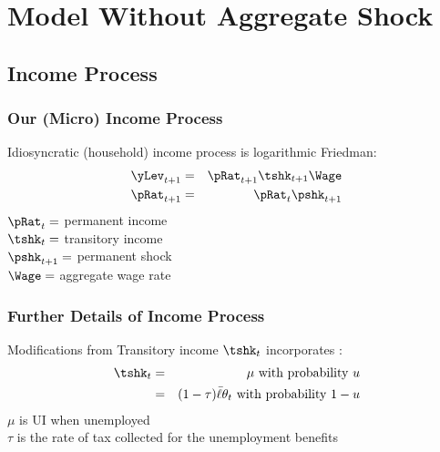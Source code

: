 \section{Model Without Aggregate Shock}

\subsection{Income Process}
\begin{frame}
\frametitle{{Our (Micro) Income Process}}

Idiosyncratic (household) income process is logarithmic Friedman:
  \begin{eqnarray*}
\yLev_{t+1}&=&\pRat_{t+1}\tshk_{t+1}\Wage\\
\pRat_{t+1}&=&\pRat_{t}\pshk_{t+1}
\end{eqnarray*}
$\pRat_{t}=$ permanent income\\
$\tshk_{t}=$ transitory income\\
$\pshk_{t+1}=$ permanent shock\\
$\Wage=$ aggregate wage rate
\end{frame}

\begin{frame}
\frametitle{{Further Details of Income Process}}

\begin{block}{Modifications from \citet{carroll:brookings}}
Transitory income $\tshk_{t}$ incorporates :
\begin{eqnarray*}
\tshk_{t} &=&\mu \text{ with probability $u$} \\
&=&(1-\tau)\bar{\ell}\theta_{t}\text{ with probability $1-u$}
\end{eqnarray*}
$\mu$ is UI when unemployed\\
 $\tau$ is the rate of tax collected for the unemployment benefits
\end{block}

\end{frame}


